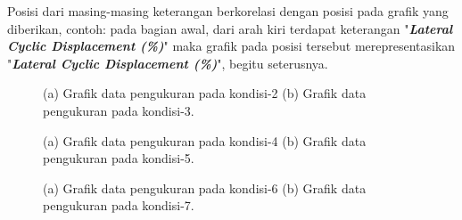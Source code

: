 Posisi dari masing-masing keterangan berkorelasi dengan posisi pada grafik yang diberikan, contoh: pada bagian awal, dari arah kiri terdapat keterangan "\textbf{\textit{Lateral Cyclic Displacement (\%)}}" maka grafik pada posisi tersebut merepresentasikan "\textbf{\textit{Lateral Cyclic Displacement (\%)}}", begitu seterusnya.

\begin{figure}[H]
	\centering
	\begin{subfigure}{0.49\textwidth}
		\centering
		\caption{}
		\label{fig:condition_2}
	\end{subfigure}
	\centering
	\begin{subfigure}{0.49\textwidth}
		\centering
		\caption{}
		\label{fig:condition_3}
	\end{subfigure}
	\caption{(a) Grafik data pengukuran pada kondisi-2 (b) Grafik data pengukuran pada kondisi-3.}
\end{figure}

\begin{figure}[H]
	\begin{subfigure}{0.49\textwidth}
		\centering
		\caption{}
		\label{fig:condition_4}
	\end{subfigure}
	\centering
	\begin{subfigure}{0.49\textwidth}
		\centering
		\caption{}
		\label{fig:condition_5}
	\end{subfigure}
	\caption{(a) Grafik data pengukuran pada kondisi-4 (b) Grafik data pengukuran pada kondisi-5.}
\end{figure}

\begin{figure}[H]
	\begin{subfigure}{0.49\textwidth}
		\centering
		\caption{}
		\label{fig:condition_6}
	\end{subfigure}
	\centering
	\begin{subfigure}{0.49\textwidth}
		\centering
		\caption{}
		\label{fig:condition_7}
	\end{subfigure}
	\caption{(a) Grafik data pengukuran pada kondisi-6 (b) Grafik data pengukuran pada kondisi-7.}
\end{figure}

